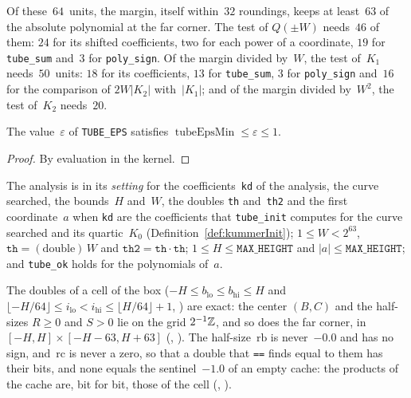 Of these~$64$~units, the margin, itself within~$32$ roundings, keeps at least~$63$ of the absolute
polynomial at the far corner. The test of $Q(\pm W)$ needs~$46$ of them: $24$ for its shifted
coefficients, two for each power of a coordinate, $19$ for \texttt{tube\_sum} and~$3$ for
\texttt{poly\_sign}. Of the margin divided by~$W$, the test of~$K_1$ needs~$50$~units: $18$ for
its coefficients, $13$ for \texttt{tube\_sum}, $3$ for \texttt{poly\_sign} and~$16$ for the
comparison of $2W|K_2|$ with~$|K_1|$; and of the margin divided by~$W^2$, the test of~$K_2$
needs~$20$.

\begin{lemma}\label{lem:tubeEpsMin_le_toRat_tubeEps}
  \leanok
  The value~$\varepsilon$ of \texttt{TUBE\_EPS} satisfies
  $\operatorname{tubeEpsMin} \le \varepsilon \le 1$.
\end{lemma}

\begin{proof}
  \leanok
  By evaluation in the kernel.
\end{proof}


\begin{definition}\label{def:TubeSetup}
  \leanok
  The analysis is in its \emph{setting} for the coefficients~\texttt{kd} of the analysis, the curve
  searched, the bounds~$H$ and~$W$, the doubles \texttt{th} and~\texttt{th2} and the first
  coordinate~$a$ when \texttt{kd} are the coefficients that \texttt{tube\_init} computes for the
  curve searched and its quartic~$K_0$ (Definition~\ref{def:kummerInit});
  $1 \le W < 2^{63}$, $\mathtt{th} = (\mathrm{double})\,W$ and
  $\mathtt{th2} = \mathtt{th} \cdot \mathtt{th}$; $1 \le H \le \mathtt{MAX\_HEIGHT}$ and
  $|a| \le \mathtt{MAX\_HEIGHT}$; and \texttt{tube\_ok} holds for the polynomials of~$a$.
\end{definition}

The doubles of a cell of the box ($-H \le b_{\mathrm{lo}} \le b_{\mathrm{hi}} \le H$ and
$\lfloor -H/64 \rfloor \le i_{\mathrm{lo}} < i_{\mathrm{hi}} \le \lfloor H/64 \rfloor + 1$,
) are exact: the center $(B, C)$ and the half-sizes $R \ge 0$ and $S > 0$
lie on the grid $2^{-1}\mathbb{Z}$, and so does the far corner, in $[-H, H] \times [-H - 63, H + 63]$
(, ). The half-size~$\mathrm{rb}$ is
never~$-0.0$ and has no sign, and~$\mathrm{rc}$ is never a zero, so that a double that \texttt{==}
finds equal to them has their bits, and none equals the sentinel~$-1.0$ of an empty cache: the
products of the cache are, bit for bit, those of the cell (,
).

